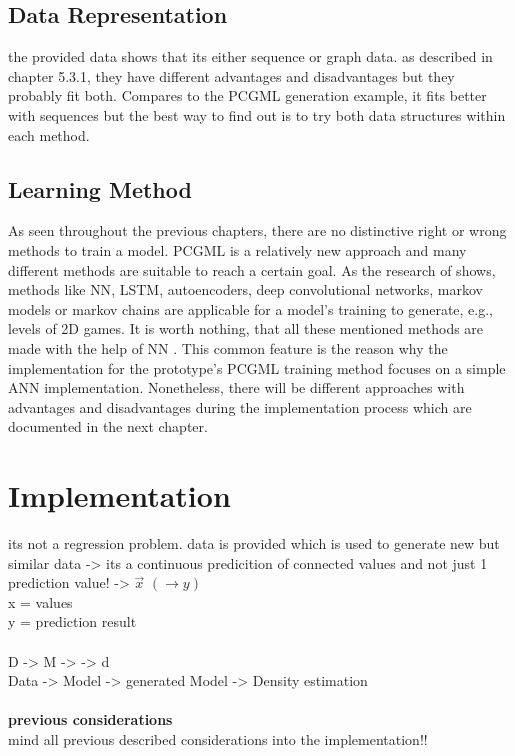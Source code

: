 \documentclass[MGS,Master,english]{twbook}%
\begin{document}
\subsection{Data Representation}
the provided data shows that its either sequence or graph data. as described in chapter 5.3.1, they have different advantages and disadvantages but they probably fit both. Compares to the PCGML generation example, it fits better with sequences but the best way to find out is to try both data structures within each method.

\subsection{Learning Method}
As seen throughout the previous chapters, there are no distinctive right or wrong methods to train a model. PCGML is a relatively new approach and many different methods are suitable to reach a certain goal. As the research of \cite{pcgml::paper} shows, methods like \ac{NN}, \ac{LSTM}, autoencoders, deep convolutional networks, markov models or markov chains are applicable for a model's training to generate, e.g., levels of \ac{2D} games. It is worth nothing, that all these mentioned methods are made with the help of \ac{NN} \cite{neuralNetworkZoo}. This common feature is the reason why the implementation for the prototype's PCGML training method focuses on a simple \ac{ANN} implementation. Nonetheless, there will be different approaches with advantages and disadvantages during the implementation process which are documented in the next chapter.

\section{Implementation}
its not a regression problem. data is provided which is used to generate new but similar data -> its a continuous predicition of connected values and not just 1 prediction value! -> $\vec{x}$ \sout{$(\rightarrow y)$} \\
x = values\\
y = prediction result\\
\\
D -> M ->  -> d\\
Data -> Model -> generated Model -> Density estimation\\
\\
\textbf{previous considerations}\\
mind all previous described considerations into the implementation!!
\end{document}
